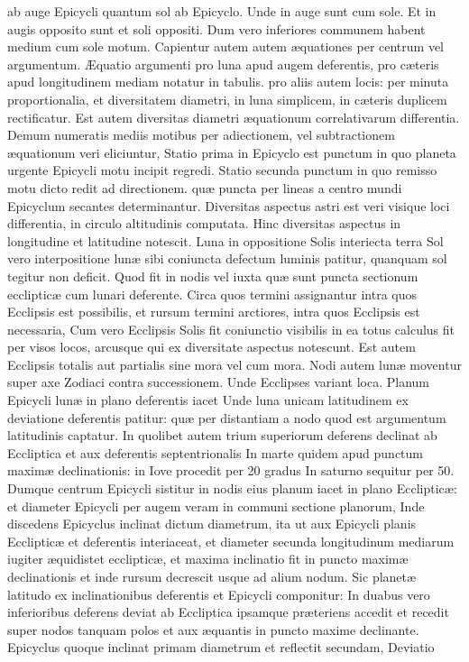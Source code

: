 \documentclass[11pt,a4paper]{article}
\begin{document}
ab auge Epicycli quantum sol ab Epicyclo. Unde in auge sunt cum sole. Et in augis opposito sunt et soli oppositi. Dum vero inferiores communem habent medium cum sole motum. Capientur autem autem æquationes per centrum vel argumentum.
Æquatio argumenti pro luna apud augem deferentis, pro cæteris apud longitudinem mediam notatur in tabulis. pro aliis autem locis: per minuta proportionalia, et diversitatem diametri, in luna simplicem, in cæteris duplicem rectificatur. Est autem diversitas diametri æquationum correlativarum differentia. Demum numeratis mediis motibus per adiectionem, vel subtractionem æquationum veri eliciuntur, Statio prima in Epicyclo est punctum in quo  planeta urgente Epicycli motu incipit regredi. Statio secunda punctum in quo remisso motu dicto redit ad directionem. quæ puncta per lineas a centro mundi Epicyclum secantes determinantur. Diversitas aspectus astri est veri visique loci differentia, in circulo altitudinis computata. Hinc diversitas aspectus in longitudine et latitudine notescit. Luna in oppositione Solis interiecta terra Sol vero  interpositione lunæ sibi coniuncta defectum luminis patitur, quanquam sol tegitur non deficit. Quod fit in nodis vel iuxta quæ sunt puncta sectionum ecclipticæ cum lunari deferente. Circa quos termini assignantur intra quos Ecclipsis est possibilis, et rursum termini arctiores, intra quos Ecclipsis est necessaria, Cum vero Ecclipsis Solis fit coniunctio visibilis in ea totus calculus fit per visos locos, arcusque qui ex diversitate aspectus notescunt. Est autem Ecclipsis totalis aut partialis sine mora vel cum mora. Nodi autem lunæ moventur super axe Zodiaci contra successionem. Unde Ecclipses variant loca. Planum Epicycli lunæ in plano deferentis iacet Unde luna unicam  latitudinem ex deviatione deferentis patitur: quæ per distantiam a nodo quod est argumentum latitudinis captatur. In quolibet autem trium superiorum deferens declinat ab Eccliptica et aux deferentis septentrionalis In marte quidem apud punctum maximæ declinationis: in Iove procedit per 20 gradus In saturno sequitur per 50. Dumque centrum Epicycli sistitur in nodis eius planum iacet in plano Ecclipticæ: et diameter Epicycli per augem veram in communi sectione planorum, Inde discedens Epicyclus inclinat \ill{} dictum diametrum, ita ut aux  Epicycli planis Ecclipticæ et deferentis interiaceat, et diameter secunda longitudinum mediarum iugiter æquidistet ecclipticæ, et maxima inclinatio fit in puncto maximæ declinationis et inde rursum decrescit usque ad alium nodum.
Sic planetæ latitudo ex inclinationibus deferentis et Epicycli componitur: In duabus vero inferioribus deferens deviat ab Eccliptica ipsamque præteriens accedit et recedit super nodos tanquam polos et aux æquantis in puncto maxime declinante. Epicyclus quoque inclinat primam diametrum et reflectit secundam, Deviatio
\end{document}
